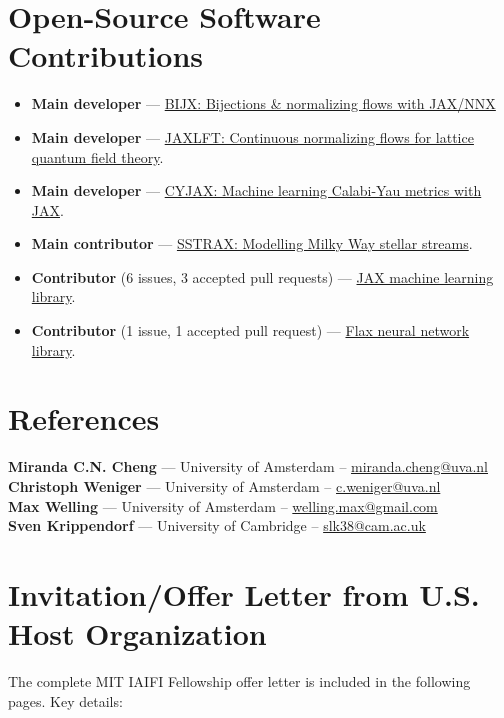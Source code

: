 \documentclass[11pt]{article}
\newcommand{\currentsection}{}
\newcommand{\sectionwithheader}[1]{
    \section{#1}
    \renewcommand{\currentsection}{\thesection. #1}
}
\begin{document}
\section*{Open-Source Software Contributions}
\begin{itemize}[left=0pt, itemsep=3pt]
    \item \textbf{Main developer} — \href{https://github.com/mathisgerdes/bijx}{BIJX: Bijections \& normalizing flows with JAX/NNX}
    \item \textbf{Main developer} — \href{https://github.com/mathisgerdes/continuous-flow-lft}{JAXLFT: Continuous normalizing flows for lattice quantum field theory}.
    \item \textbf{Main developer} — \href{https://github.com/ml4physics/cyjax}{CYJAX: Machine learning Calabi-Yau metrics with JAX}.
    \item \textbf{Main contributor} — \href{https://github.com/undark-lab/sstrax}{SSTRAX: Modelling Milky Way stellar streams}.
    \item \textbf{Contributor} (6 issues, 3 accepted pull requests) — \href{https://github.com/google/jax/issues?q=author:mathisgerdes}{JAX machine learning library}.
    \item \textbf{Contributor} (1 issue, 1 accepted pull request) — \href{https://github.com/google/flax/issues?q=author:mathisgerdes}{Flax neural network library}.
\end{itemize}


\section*{References}
\noindent
\textbf{Miranda C.N. Cheng} — University of Amsterdam -- \href{mailto:c.n.cheng@uva.nl}{miranda.cheng@uva.nl} \\
\textbf{Christoph Weniger} — University of Amsterdam  -- \href{mailto:c.weniger@uva.nl}{c.weniger@uva.nl} \\
\textbf{Max Welling} — University of Amsterdam -- \href{mailto:welling.max@gmail.com}{welling.max@gmail.com} \\
\textbf{Sven Krippendorf} — University of Cambridge -- \href{mailto:slk38@cam.ac.uk}{slk38@cam.ac.uk}

\newpage

\sectionwithheader{Invitation/Offer Letter from U.S. Host Organization}

The complete MIT IAIFI Fellowship offer letter is included in the following pages. Key details:
\end{document}
